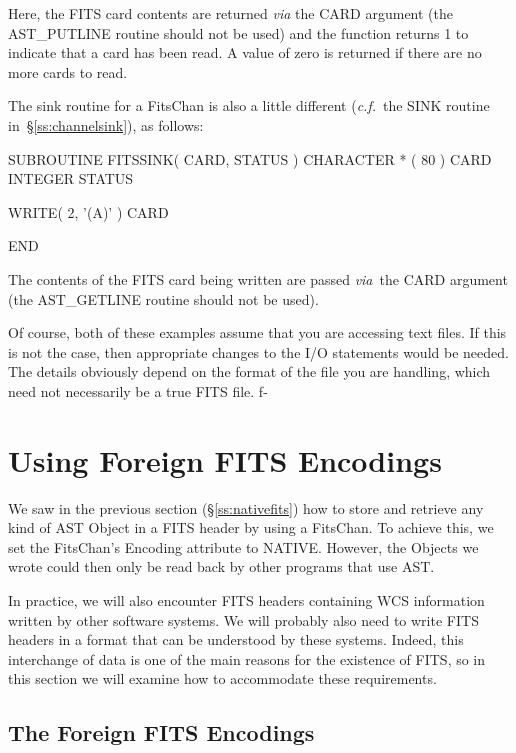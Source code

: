 \documentclass[twoside,11pt]{starlink}
\providecommand{\secref}[1]{\S\ref{#1}}
\begin{document}
Here, the FITS card contents are returned \emph{via} the CARD argument
(the AST\_PUTLINE routine should not be used) and the function returns
1 to indicate that a card has been read. A value of zero is returned
if there are no more cards to read.

The sink routine for a FitsChan is also a little different
(\emph{c.f.}\ the SINK routine in~\secref{ss:channelsink}), as
follows:

\small
\begin{terminalv}
      SUBROUTINE FITSSINK( CARD, STATUS )
      CHARACTER * ( 80 ) CARD
      INTEGER STATUS

      WRITE( 2, '(A)' ) CARD

      END
\end{terminalv}
\normalsize

The contents of the FITS card being written are passed \emph{via}\ the
CARD argument (the AST\_GETLINE routine should not be used).

Of course, both of these examples assume that you are accessing text
files. If this is not the case, then appropriate changes to the I/O
statements would be needed.  The details obviously depend on the
format of the file you are handling, which need not necessarily be a
true FITS file.
f-

\cleardoublepage
\section{\label{ss:foreignfits}Using Foreign FITS Encodings}

We saw in the previous section (\secref{ss:nativefits}) how to store
and retrieve any kind of AST Object in a FITS header by using a
FitsChan. To achieve this, we set the FitsChan's Encoding attribute to
NATIVE. However, the Objects we wrote could then only be read back by
other programs that use AST.

In practice, we will also encounter FITS headers containing WCS
information written by other software systems.  We will probably also
need to write FITS headers in a format that can be understood by these
systems. Indeed, this interchange of data is one of the main reasons
for the existence of FITS, so in this section we will examine how to
accommodate these requirements.

\subsection{\label{ss:foreignencodings}The Foreign FITS Encodings}
\end{document}
